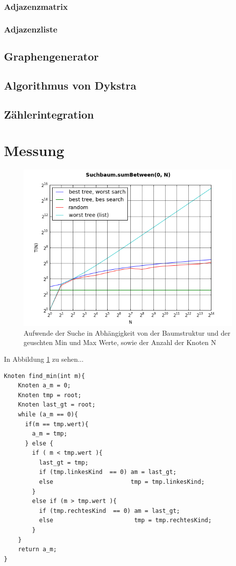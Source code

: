 \documentclass[
   draft=false
  ,paper=a4
  ,twoside=false
  ,fontsize=11pt
  ,headsepline
  ,DIV11
  ,parskip=full+
]{scrartcl} %
\begin{document}
\subsubsection{Adjazenzmatrix}

\subsubsection{Adjazenzliste}

\subsection{Graphengenerator}

\subsection{Algorithmus von Dykstra}

\subsection{Zählerintegration}

\section{Messung}

\begin{figure}[htp]
  	\centering
    \includegraphics[width=\textwidth]{./IMG/plot.png}
    \caption[shortone]{Aufwende der Suche in Abhängigkeit
     von der Baumstruktur und der geuschten
      Min und Max Werte, sowie der Anzahl der Knoten N}
    \label{fig:plot}
\end{figure}

In Abbildung \ref{fig:plot} zu sehen...


  \begin{lstlisting}
Knoten find_min(int m){
	Knoten a_m = 0;
	Knoten tmp = root;
	Knoten last_gt = root;
	while (a_m == 0){
	  if(m == tmp.wert){
	    a_m = tmp;
	  } else {
	    if ( m < tmp.wert ){
	      last_gt = tmp;
	      if (tmp.linkesKind  == 0) am = last_gt;
	      else                      tmp = tmp.linkesKind;
	    }
	    else if (m > tmp.wert ){
	      if (tmp.rechtesKind  == 0) am = last_gt;
	      else                       tmp = tmp.rechtesKind;
	    }
	}
	return a_m;
}
\end{lstlisting}
\end{document}

